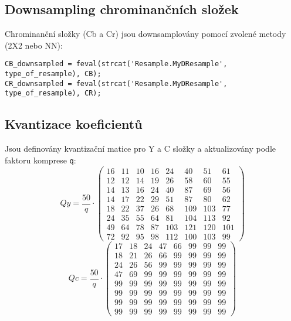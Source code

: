 \subsection{Downsampling chrominančních složek}
Chrominanční složky (Cb a Cr) jsou downsamplovány pomocí zvolené metody (2X2 nebo NN):
\begin{verbatim}
CB_downsampled = feval(strcat('Resample.MyDResample', type_of_resample), CB);
CR_downsampled = feval(strcat('Resample.MyDResample', type_of_resample), CR);
\end{verbatim}

\subsection{Kvantizace koeficientů}
Jsou definovány kvantizační matice pro Y a C složky a aktualizovány podle faktoru komprese \texttt{q}\cite{pIDhmNtdwMgbcGoe}\cite{ygeiGeoinf2}:
\[
Qy = \frac{50}{q} \cdot \begin{pmatrix}
16 & 11 & 10 & 16 & 24 & 40 & 51 & 61 \\
12 & 12 & 14 & 19 & 26 & 58 & 60 & 55 \\
14 & 13 & 16 & 24 & 40 & 87 & 69 & 56 \\
14 & 17 & 22 & 29 & 51 & 87 & 80 & 62 \\
18 & 22 & 37 & 26 & 68 & 109 & 103 & 77 \\
24 & 35 & 55 & 64 & 81 & 104 & 113 & 92 \\
49 & 64 & 78 & 87 & 103 & 121 & 120 & 101 \\
72 & 92 & 95 & 98 & 112 & 100 & 103 & 99
\end{pmatrix}
\]
\[
Qc = \frac{50}{q} \cdot \begin{pmatrix}
17 & 18 & 24 & 47 & 66 & 99 & 99 & 99 \\
18 & 21 & 26 & 66 & 99 & 99 & 99 & 99 \\
24 & 26 & 56 & 99 & 99 & 99 & 99 & 99 \\
47 & 69 & 99 & 99 & 99 & 99 & 99 & 99 \\
99 & 99 & 99 & 99 & 99 & 99 & 99 & 99 \\
99 & 99 & 99 & 99 & 99 & 99 & 99 & 99 \\
99 & 99 & 99 & 99 & 99 & 99 & 99 & 99 \\
99 & 99 & 99 & 99 & 99 & 99 & 99 & 99
\end{pmatrix}
\]

